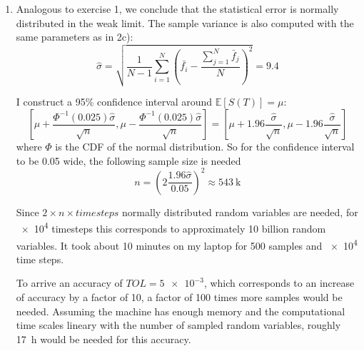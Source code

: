 \documentclass[a4paper,11pt]{scrartcl}
\newcommand*{\E}{\mathbb{E}}
\newcommand*{\EV}[1]{\E\left[{#1}\right]}
\begin{document}
\begin{enumerate}
\begin{enumerate}[leftmargin=1em]
    The parameters used where $\alpha=100, r=0.04, T=\frac{3}{4}, Y_0 = -1,
    S_0=K=100$ and $\rho=-0.3$.

    With \num{e4} Monte Carlo samples and \num{e4} equidistant time steps I
    get for the option value
    \[ f(0, S_0) = e^{-rT} \EV{\max{(S(T) - K, 0)}} = \num{7.02}\]

  \item
    Analogous to exercise 1, we conclude that the statistical error is normally
    distributed in the weak limit.
    The sample variance is also computed with the same parameters
    as in 2c):
    \[ \hat{\sigma} = \sqrt{\frac{1}{N - 1} \sum_{i=1}^N \left( \bar{f_i}  -
        \frac{\sum^N_{j=1}  \bar{f}_j}{N} \right)^2} = \num{9.4} \]

    I construct a 95\% confidence interval around $\EV{S(T)} = \mu$:
    \[ \left[\mu + \frac{\Phi^{-1}(0.025)\hat{\sigma}}{\sqrt{n}},
        \mu - \frac{\Phi^{-1}(0.025)\hat{\sigma}}{\sqrt{n}}\right]
      = \left[\mu + 1.96 \frac{\hat{\sigma}}{\sqrt{n}},
         \mu - 1.96 \frac{\hat{\sigma}}{\sqrt{n}} \right]
    \]
  where $\Phi$ is the CDF of the normal distribution.
  So for the confidence interval to be \num{0.05} wide, the following sample
  size is needed
  \[ n = \left(2\frac{1.96 \hat{\sigma}}{0.05}\right)^2 \approx \SI{543}{\kilo} \]

  Since $2 \times n \times timesteps$ normally distributed random variables are
  needed, for \num{e4} timesteps this corresponds to approximately 10 billion
  random variables.
  It took about 10 minutes on my laptop for \SI{500}{\kilo} samples and \num{e4}
  time steps.

  To arrive an accuracy of $TOL=\num{5e-3}$, which corresponds to an increase of
  accuracy by a factor of 10, a factor of 100 times more samples would be needed.
  Assuming the machine has enough memory and the computational time scales
  lineary with the number of sampled random variables, roughly \SI{17}{\hour}
  would be needed for this accuracy.
    
\end{enumerate}

\end{enumerate}



%   
\end{document}
